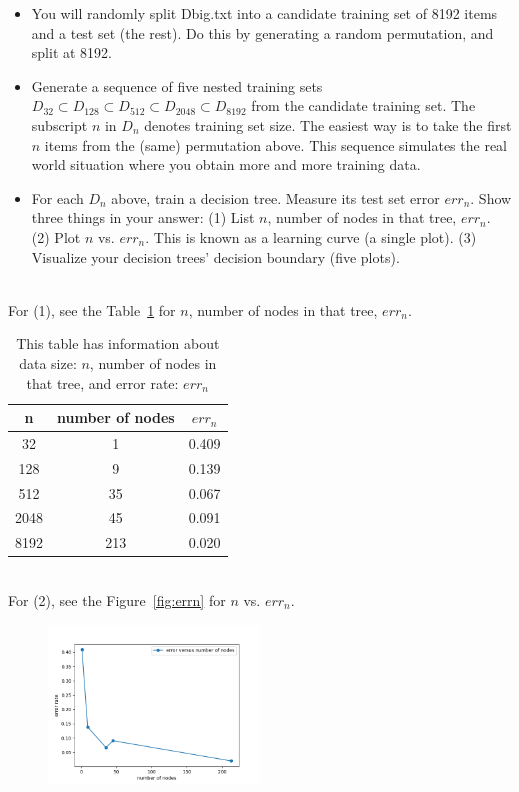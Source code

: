 \documentclass[a4paper]{article}
\theoremstyle{definition}
\newenvironment{soln}{
    \leavevmode\color{blue}\ignorespaces
}{}
\begin{document}
\begin{enumerate}
\begin{itemize}
  \item You will randomly split Dbig.txt into a candidate training set of 8192 items and a test set (the rest).  Do this by generating a random permutation, and split at 8192.
  
  \item Generate a sequence of five nested training sets $D_{32} \subset D_{128} \subset D_{512} \subset D_{2048} \subset D_{8192}$ from the candidate training set.  The subscript $n$ in $D_n$ denotes training set size.  The easiest way is to take the first $n$ items from the (same) permutation above.  This sequence simulates the real world situation where you obtain more and more training data.
  
  \item For each $D_n$ above, train a decision tree.  Measure its test set error $err_n$.  Show three things in your answer: (1) List $n$, number of nodes in that tree, $err_n$. (2) Plot $n$ vs. $err_n$.  This is known as a learning curve (a single plot). (3) Visualize your decision trees' decision boundary (five plots). \\
  \end{itemize}
  \begin{soln}
    \\For (1), see the Table~\ref{tab:errn} for $n$, number of nodes in that tree, $err_n$.
    \begin{table}
      \centering
      \begin{tabular}{|c|c|c|}
        \hline
        n & number of nodes & $err_n$ \\
        \hline
        32 & 1 & 0.409 \\
        \hline
        128 & 9 & 0.139 \\
        \hline
        512 & 35 & 0.067 \\
        \hline
        2048 & 45 & 0.091 \\
        \hline
        8192 & 213 & 0.020 \\
        \hline
      \end{tabular}
      \caption{This table has information about data size: $n$, number of nodes in that tree, and error rate: $err_n$}
      \label{tab:errn}
    \end{table}
    \\For (2), see the Figure~\ref{fig:errn} for $n$ vs. $err_n$.
    \begin{figure}
      \centering
      \includegraphics[width=0.5\textwidth]{./data/errvsnodes.png}

\end{figure}
\end{soln}
\end{enumerate}
\end{document}
